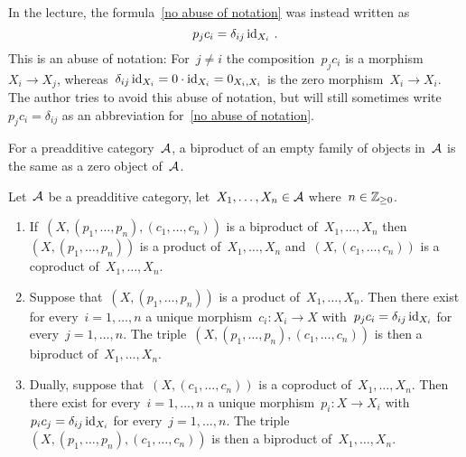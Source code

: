 \begin{remark*}
  In the lecture, the formula~\ref{no abuse of notation} was instead written as
  \[
      p_j c_i
    = \delta_{ij} \operatorname{id}_{X_i} \,.
  \]
  This is an abuse of notation:
  For~$j \neq i$ the composition~$p_j c_i$ is a morphism~$X_i \to X_j$, whereas~$\delta_{ij} \operatorname{id}_{X_i} = 0 \cdot \operatorname{id}_{X_i} = 0_{X_i, X_i}$ is the zero morphism~$X_i \to X_i$.
  The author tries to avoid this abuse of notation, but will still sometimes write~$p_j c_i = \delta_{ij}$ as an abbreviation for~\eqref{no abuse of notation}.
\end{remark*}


\begin{remarknonum}
  For a preadditive category~$\mathcal{A}$, a biproduct of an empty family of objects in~$\mathcal{A}$ is the same as a zero object of~$\mathcal{A}$.
\end{remarknonum}


\begin{lemma}
  \label{product coproduct biproduct}
  Let~$\mathcal{A}$ be a preadditive category, let~$X_1, \dotsc, X_n \in \mathcal{A}$ where~$n \in \mathbb{Z}_{\geq 0}$.
  \begin{enumerate}
    \item
      If~$(X, (p_1, \dotsc, p_n), (c_1, \dotsc, c_n))$ is a biproduct of~$X_1, \dotsc, X_n$ then~$(X, (p_1, \dotsc, p_n))$ is a product of~$X_1, \dotsc, X_n$ and~$(X, (c_1, \dotsc, c_n))$ is a coproduct of~$X_1, \dotsc, X_n$.
    \item
      \label{products into biproducts}
      Suppose that~$(X, (p_1, \dotsc, p_n))$ is a product of~$X_1, \dotsc, X_n$.
      Then there exist for every~$i = 1, \dotsc, n$ a unique morphism~$c_i \colon X_i \to X$ with~$p_j c_i = \delta_{ij} \operatorname{id}_{X_i}$ for every~$j = 1, \dotsc, n$.
      The triple~$(X, (p_1, \dotsc, p_n), (c_1, \dotsc, c_n))$ is then a biproduct of~$X_1, \dotsc, X_n$.
    \item
      Dually, suppose that~$(X, (c_1, \dotsc, c_n))$ is a coproduct of~$X_1, \dotsc, X_n$.
      Then there exist for every~$i = 1, \dotsc, n$ a unique morphism~$p_i \colon X \to X_i$ with~$p_i c_j = \delta_{ij} \operatorname{id}_{X_i}$ for every~$j = 1, \dotsc, n$.
      The triple~$(X, (p_1, \dotsc, p_n), (c_1, \dotsc, c_n))$ is then a biproduct of~$X_1, \dotsc, X_n$.
  \end{enumerate}
\end{lemma}


